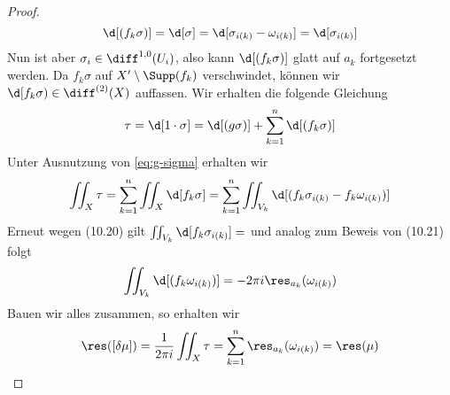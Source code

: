 \begin{proof}
\[  \d[(f_k \sigma)] = \d[\sigma] = \d[\sigma_{i(k)} - \omega_{i(k)}] =
  \d[\sigma_{i(k)}]
  \]
  Nun ist aber $\sigma_i \in \diff^{1,0}(U_i)$, also kann $\d[(f_k
  \sigma)]$ glatt auf $a_k$ fortgesetzt werden. Da $f_k\sigma$ auf $X'
  \setminus \Supp(f_k)$ verschwindet, können wir $\d[f_k \sigma) \in
  \diff^{(2)}(X)$ auffassen. Wir erhalten die folgende Gleichung
  \[
  \tau = \d[1 \cdot \sigma] = \d[(g\sigma)] + \sum_{k=1}^n \d[(f_k
  \sigma)]
  \]
  Unter Ausnutzung von \eqref{eq:g-sigma} erhalten wir
  \[
  \iint_X \tau = \sum_{k=1}^n \iint_X \d[f_k \sigma] = \sum_{k=1}^n
  \iint_{V_k} \d[(f_k\sigma_{i(k)} - f_k \omega_{i(k)} )]
  \]
  Erneut wegen (10.20) gilt $\iint_{V_k} \d[f_k \sigma_{i(k)}] = $ und
  analog zum Beweis von (10.21) folgt
  \[
  \iint_{V_k} \d[(f_k \omega_{i(k)})] = - 2\pi i
  \res_{a_k}(\omega_{i(k)})
  \]
  Bauen wir alles zusammen, so erhalten wir
  \[
  \res([\delta \mu]) = \frac{1}{2\pi i} \iint_X \tau = \sum_{k=1}^n
  \res_{a_k}(\omega_{i(k)}) = \res(\mu)
  \]
  

\end{proof}



